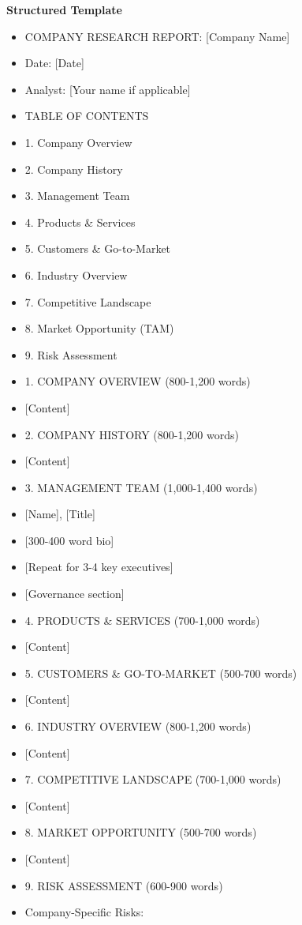 \documentclass[11pt]{article}
\begin{document}
\textbf{Structured Template}
\begin{itemize}[leftmargin=*,itemsep=2pt,topsep=2pt]
\item {} COMPANY RESEARCH REPORT: [Company Name]
\item {} Date: [Date]
\item {} Analyst: [Your name if applicable]
\item {} TABLE OF CONTENTS
\item {} 1. Company Overview
\item {} 2. Company History
\item {} 3. Management Team
\item {} 4. Products \& Services
\item {} 5. Customers \& Go-to-Market
\item {} 6. Industry Overview
\item {} 7. Competitive Landscape
\item {} 8. Market Opportunity (TAM)
\item {} 9. Risk Assessment
\item {} 1. COMPANY OVERVIEW (800-1,200 words)
\item {} [Content]
\item {} 2. COMPANY HISTORY (800-1,200 words)
\item {} [Content]
\item {} 3. MANAGEMENT TEAM (1,000-1,400 words)
\item {} [Name], [Title]
\item {} [300-400 word bio]
\item {} [Repeat for 3-4 key executives]
\item {} [Governance section]
\item {} 4. PRODUCTS \& SERVICES (700-1,000 words)
\item {} [Content]
\item {} 5. CUSTOMERS \& GO-TO-MARKET (500-700 words)
\item {} [Content]
\item {} 6. INDUSTRY OVERVIEW (800-1,200 words)
\item {} [Content]
\item {} 7. COMPETITIVE LANDSCAPE (700-1,000 words)
\item {} [Content]
\item {} 8. MARKET OPPORTUNITY (500-700 words)
\item {} [Content]
\item {} 9. RISK ASSESSMENT (600-900 words)
\item {} Company-Specific Risks:

\end{itemize}
\end{document}
